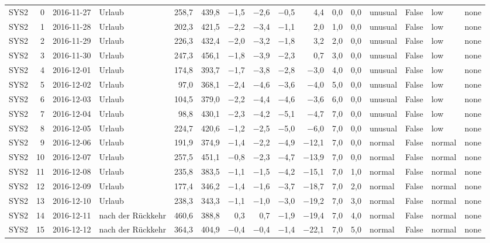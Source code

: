 \begin{tabular}{lrllrrrrrrrrlrll}
SYS2 & 0 & 2016-11-27 & Urlaub & 258,7 & 439,8 & $-$1,5 & $-$2,6 & $-$0,5 & 4,4 & 0,0 & 0,0 & unusual & False & low & none \\
SYS2 & 1 & 2016-11-28 & Urlaub & 202,3 & 421,5 & $-$2,2 & $-$3,4 & $-$1,1 & 2,0 & 1,0 & 0,0 & unusual & False & low & none \\
SYS2 & 2 & 2016-11-29 & Urlaub & 226,3 & 432,4 & $-$2,0 & $-$3,2 & $-$1,8 & 3,2 & 2,0 & 0,0 & unusual & False & low & none \\
SYS2 & 3 & 2016-11-30 & Urlaub & 247,3 & 456,1 & $-$1,8 & $-$3,9 & $-$2,3 & 0,7 & 3,0 & 0,0 & unusual & False & low & none \\
SYS2 & 4 & 2016-12-01 & Urlaub & 174,8 & 393,7 & $-$1,7 & $-$3,8 & $-$2,8 & $-$3,0 & 4,0 & 0,0 & unusual & False & low & none \\
SYS2 & 5 & 2016-12-02 & Urlaub & 97,0 & 368,1 & $-$2,4 & $-$4,6 & $-$3,6 & $-$4,0 & 5,0 & 0,0 & unusual & False & low & none \\
SYS2 & 6 & 2016-12-03 & Urlaub & 104,5 & 379,0 & $-$2,2 & $-$4,4 & $-$4,6 & $-$3,6 & 6,0 & 0,0 & unusual & False & low & none \\
SYS2 & 7 & 2016-12-04 & Urlaub & 98,8 & 430,1 & $-$2,3 & $-$4,2 & $-$5,1 & $-$4,7 & 7,0 & 0,0 & unusual & False & low & none \\
SYS2 & 8 & 2016-12-05 & Urlaub & 224,7 & 420,6 & $-$1,2 & $-$2,5 & $-$5,0 & $-$6,0 & 7,0 & 0,0 & unusual & False & low & none \\
SYS2 & 9 & 2016-12-06 & Urlaub & 191,9 & 374,9 & $-$1,4 & $-$2,2 & $-$4,9 & $-$12,1 & 7,0 & 0,0 & normal & False & normal & none \\
SYS2 & 10 & 2016-12-07 & Urlaub & 257,5 & 451,1 & $-$0,8 & $-$2,3 & $-$4,7 & $-$13,9 & 7,0 & 0,0 & normal & False & normal & none \\
SYS2 & 11 & 2016-12-08 & Urlaub & 235,8 & 383,5 & $-$1,1 & $-$1,5 & $-$4,2 & $-$15,1 & 7,0 & 1,0 & normal & False & normal & none \\
SYS2 & 12 & 2016-12-09 & Urlaub & 177,4 & 346,2 & $-$1,4 & $-$1,6 & $-$3,7 & $-$18,7 & 7,0 & 2,0 & normal & False & normal & none \\
SYS2 & 13 & 2016-12-10 & Urlaub & 238,3 & 343,3 & $-$1,1 & $-$1,0 & $-$3,0 & $-$19,2 & 7,0 & 3,0 & normal & False & normal & none \\
SYS2 & 14 & 2016-12-11 & nach der Rückkehr & 460,6 & 388,8 & 0,3 & 0,7 & $-$1,9 & $-$19,4 & 7,0 & 4,0 & normal & False & normal & none \\
SYS2 & 15 & 2016-12-12 & nach der Rückkehr & 364,3 & 404,9 & $-$0,4 & $-$0,4 & $-$1,4 & $-$22,1 & 7,0 & 5,0 & normal & False & normal & none \\

\end{tabular}
